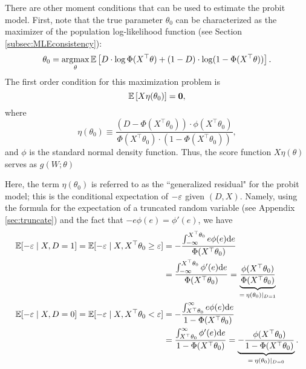 \documentclass[11pt, A4paper, openany, uplatex]{book}
\begin{document}
\begin{example}\label{ex:prob2}\upshape
	There are other moment conditions that can be used to estimate the probit model.
	First, note that the true parameter $\theta_0$  can be characterized as the maximizer of the population log-likelihood function (see Section \ref{subsec:MLEconsistency}):
	\[
		\theta_0 = \operatorname*{\arg\!\max}_\theta \mathbb{E}\left[ D \cdot \log \Phi(X^\top \theta) + (1 - D) \cdot \log (1 - \Phi(X^\top \theta ) )  \right].
	\]
	The first order condition for this maximization problem is
	\[
		\mathbb{E}\left[ X  \eta(\theta_0) \right] = \mathbf{0},
	\]
	where
	\[
		\eta(\theta_0) \equiv \frac{(D - \Phi(X^\top \theta_0)) \cdot \phi(X ^\top \theta_0)}{\Phi(X^\top \theta_0) \cdot (1 - \Phi(X^\top \theta_0) )},
	\]
	and $\phi$ is the standard normal density function.
	Thus, the score function $X  \eta(\theta)$ serves as $g(W; \theta)$
	
	Here, the term $\eta(\theta_0)$ is referred to as the ``generalized residual" for the probit model; this is the conditional expectation of $-\varepsilon$ given $(D, X)$.
	Namely, using the formula for the expectation of a truncated random variable (see Appendix \ref{sec:truncate}) and the fact  that $-e\phi(e) = \phi'(e)$, we have
	\begin{align*}
		\mathbb{E}[-\varepsilon \mid X, D = 1] = \mathbb{E}[-\varepsilon \mid X, X^\top\theta_0 \geq \varepsilon] 
		& = -\frac{\int_{-\infty}^{X^\top\theta_0} e \phi(e) \mathrm{d}e}{\Phi(X^\top\theta_0)} \\
		& =  \frac{ \int_{-\infty}^{X^\top\theta_0} \phi'(e) \mathrm{d}e}{\Phi(X^\top\theta_0)} = \underbrace{\frac{ \phi(X^\top \theta_0)}{\Phi(X^\top\theta_0)}}_{= \: \eta(\theta_0)|_{D = 1}}\\
		\mathbb{E}[-\varepsilon \mid X, D = 0] = \mathbb{E}[-\varepsilon \mid X, X^\top\theta_0 < \varepsilon] 
		& = - \frac{\int_{X^\top\theta_0}^\infty e \phi(e) \mathrm{d}e}{1 - \Phi(X^\top\theta_0)} \\
		& = \frac{ \int_{X^\top\theta_0}^\infty \phi'(e) \mathrm{d}e}{1- \Phi(X^\top\theta_0)} = \underbrace{-\frac{ \phi(X^\top \theta_0)}{1- \Phi(X^\top\theta_0)}}_{= \: \eta(\theta_0)|_{D = 0}}.
	\end{align*}
\end{example}
\end{document}
